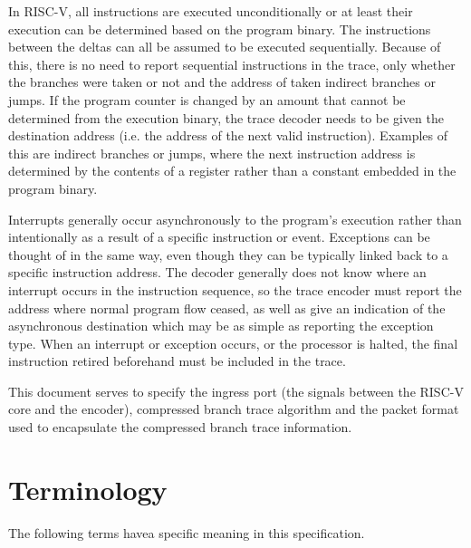 In RISC-V, all instructions are executed unconditionally or at least
their execution can be determined based on the program binary. The
instructions between the deltas can all be assumed to be executed
sequentially. Because of this, there is no need to report sequential 
instructions in the trace, only whether the branches were taken or not
and the address of taken indirect branches or jumps. If the program
counter is changed by an amount that cannot be determined from the
execution binary, the trace decoder needs to be given the destination
address (i.e. the address of the next valid instruction).  Examples of
this are indirect branches or jumps, where the next instruction
address is determined by the contents of a register rather than a
constant embedded in the program binary.

Interrupts generally occur asynchronously to the program's execution
rather than intentionally as a result of a specific instruction or
event.  Exceptions can be thought of in the same way, even though they
can be typically linked back to a specific instruction address.  The
decoder generally does not know where an interrupt occurs in the
instruction sequence, so the trace encoder must report the address
where normal program flow ceased, as well as give an indication of the
asynchronous destination which may be as simple as reporting the
exception type.  When an interrupt or exception occurs, or the
processor is halted, the final instruction retired beforehand must be
included in the trace.

This document serves to specify the ingress port (the signals between
the RISC-V core and the encoder), compressed branch trace algorithm and
the packet format used to encapsulate the compressed branch trace
information.

\section{Terminology} \label{sec:terminology}

The following terms havea specific meaning in this specification.

